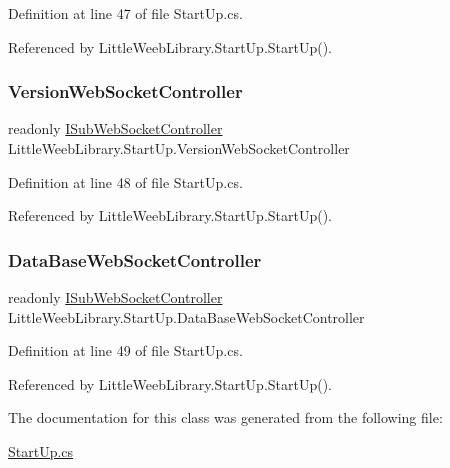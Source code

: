 Definition at line 47 of file Start\+Up.\+cs.



Referenced by Little\+Weeb\+Library.\+Start\+Up.\+Start\+Up().

\mbox{\label{class_little_weeb_library_1_1_start_up_a7f740efb00da5359c15ecb26a05fd528}} 
\subsubsection{\texorpdfstring{Version\+Web\+Socket\+Controller}{VersionWebSocketController}}
{\footnotesize\ttfamily readonly \mbox{\hyperlink{interface_little_weeb_library_1_1_controllers_1_1_i_sub_web_socket_controller}{I\+Sub\+Web\+Socket\+Controller}} Little\+Weeb\+Library.\+Start\+Up.\+Version\+Web\+Socket\+Controller\hspace{0.3cm}{\ttfamily [private]}}



Definition at line 48 of file Start\+Up.\+cs.



Referenced by Little\+Weeb\+Library.\+Start\+Up.\+Start\+Up().

\mbox{\label{class_little_weeb_library_1_1_start_up_a0d332718adef991399ef83c637f60fd8}} 
\subsubsection{\texorpdfstring{Data\+Base\+Web\+Socket\+Controller}{DataBaseWebSocketController}}
{\footnotesize\ttfamily readonly \mbox{\hyperlink{interface_little_weeb_library_1_1_controllers_1_1_i_sub_web_socket_controller}{I\+Sub\+Web\+Socket\+Controller}} Little\+Weeb\+Library.\+Start\+Up.\+Data\+Base\+Web\+Socket\+Controller\hspace{0.3cm}{\ttfamily [private]}}



Definition at line 49 of file Start\+Up.\+cs.



Referenced by Little\+Weeb\+Library.\+Start\+Up.\+Start\+Up().



The documentation for this class was generated from the following file\+:\begin{DoxyCompactItemize}
\item 
\mbox{\hyperlink{_start_up_8cs}{Start\+Up.\+cs}}\end{DoxyCompactItemize}
